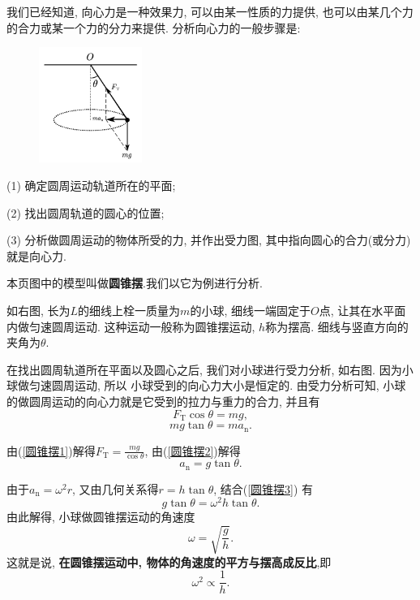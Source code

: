 \documentclass[11pt,a4paper]{ctexart}
\begin{document}
我们已经知道, 向心力是一种效果力, 可以由某一性质的力提供, 也可以由某几个力的合力或某一个力的分力来提供.
分析向心力的一般步骤是:

\begin{figure}
	\flushright
	\includegraphics[width=0.3\textwidth]{pic/pic9.pdf}
	\label{fig9}
\end{figure}

(1) 确定圆周运动轨道所在的平面;

(2) 找出圆周轨道的圆心的位置;

(3) 分析做圆周运动的物体所受的力, 并作出受力图, 其中指向圆心的合力(或分力)就是向心力.

本页图中的模型叫做\textbf{圆锥摆}.我们以它为例进行分析.

如右图, 长为$L$的细线上栓一质量为$m$的小球, 细线一端固定于$O$点, 让其在水平面内做匀速圆周运动.
这种运动一般称为圆锥摆运动, $h$称为摆高. 细线与竖直方向的夹角为$\theta$.

在找出圆周轨道所在平面以及圆心之后, 我们对小球进行受力分析, 如右图. 因为小球做匀速圆周运动, 所以
小球受到的向心力大小是恒定的. 由受力分析可知, 小球的做圆周运动的向心力就是它受到的拉力与重力的合力,
并且有
\begin{equation}
	F_\mathrm{T} \cos \theta = mg,
	\label{圆锥摆1}
\end{equation}
\begin{equation}
	mg \tan \theta = ma_\mathrm{n}.
	\label{圆锥摆2}
\end{equation}

由(\ref{圆锥摆1})解得$F_\mathrm{T} = \displaystyle\frac{mg}{\cos \theta}$,
由(\ref{圆锥摆2})解得
\begin{equation}
	a_\mathrm{n} = g\tan \theta.
	\label{圆锥摆3}
\end{equation}

由于$a_\mathrm{n}=\omega^2 r$, 又由几何关系得$r = h \tan \theta$, 结合(\ref{圆锥摆3})
有$$g\tan \theta = \omega^2 h \tan \theta.$$
由此解得, 小球做圆锥摆运动的角速度$$\omega = \sqrt{\frac{g}{h}}.$$
这就是说, \textbf{在圆锥摆运动中, 物体的角速度的平方与摆高成反比},即$$\omega^2 \propto \frac{1}{h}.$$
\end{document}
